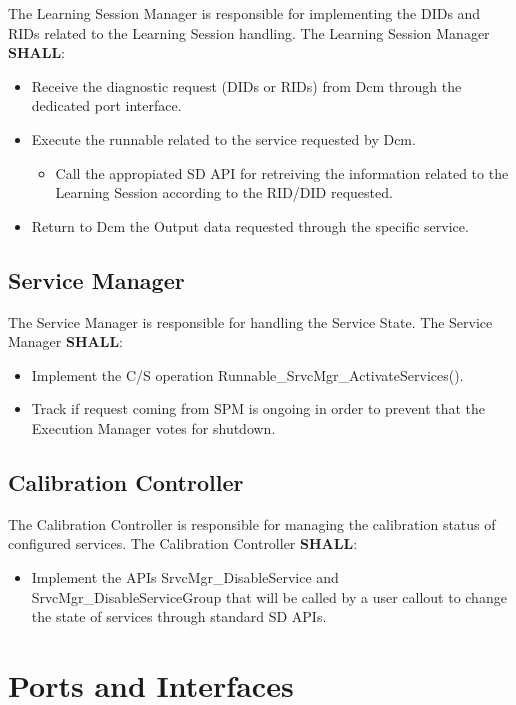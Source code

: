 The Learning Session Manager is responsible for implementing the DIDs and RIDs related to the Learning Session handling. The Learning Session Manager \textbf{SHALL}:
\begin{itemize}
\item Receive the diagnostic request (DIDs or RIDs) from Dcm through the dedicated port interface.
\item Execute the runnable related to the service requested by Dcm.
\begin{itemize}
\item Call the appropiated SD API for retreiving the information related to the Learning Session according to the RID/DID requested.
\end{itemize}
\item Return to Dcm the Output data requested through the specific service.    
\end{itemize}


\subsection{Service Manager}
\label{subsec:ProjSpecServiceManagerStatic}

The Service Manager is responsible for handling the Service State. The Service Manager \textbf{SHALL}:
\begin{itemize}
\item Implement the C/S operation Runnable_SrvcMgr_ActivateServices().
\item Track if request coming from SPM is ongoing in order to prevent that the Execution Manager votes for shutdown.
\end{itemize}

\subsection{Calibration Controller}
\label{subsec:CalibControllerStatic}
The Calibration Controller is responsible for managing the calibration status of configured services. The Calibration Controller \textbf{SHALL}:
\begin{itemize}
\item Implement the APIs SrvcMgr_DisableService and SrvcMgr_DisableServiceGroup that will be called by a user callout to change the state of services through standard SD APIs.    
\end{itemize}


\section{Ports and Interfaces}
\label{sec:portInterfaces}
\\
{
    
}

